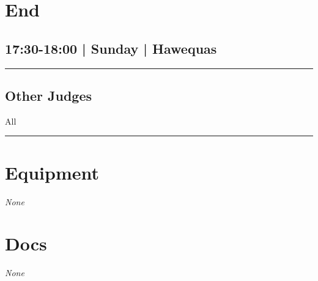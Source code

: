 \documentclass[10pt, A5]{article}
\begin{document}
        \begin{framed}
        \begin{minipage}{\textwidth}

        \setcounter{section}{94}
        \section{End}
        \subsection*{17:30-18:00 | Sunday | Hawequas}

        \vspace{0.25cm}
        \hrule
        \vspace{0.25cm}


        \subsection*{Other Judges}
                    All

            \vspace{0.25cm}
        \hrule
        \vspace{0.25cm}

        \begin{multicols}{2}

		\section*{\faWrench \: Equipment}

				\textit{None}
		
		\vfill\null
		\columnbreak

			\section*{\faFile \: Docs}
		 	\textit{None}
	

		\vfill\null

		\end{multicols}
\end{minipage}
\end{framed}
    

	\clearpage

	
\end{document}
